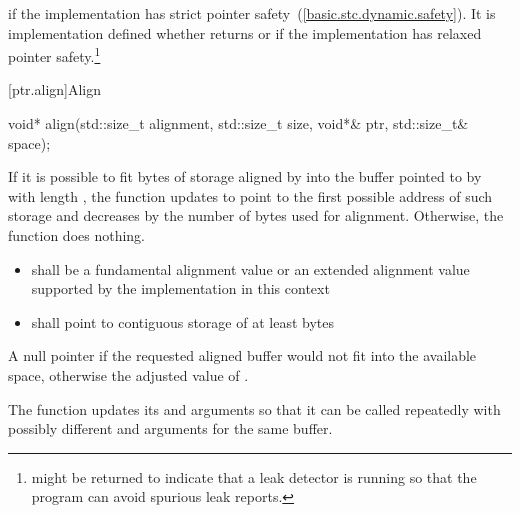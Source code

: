 \begin{itemdescr}
\pnum
\returns {} if the implementation has strict pointer
safety~(\ref{basic.stc.dynamic.safety}). It is implementation defined%
whether
 returns  or
 if the implementation has relaxed pointer
safety.\footnote{ might be returned to indicate
that a leak detector is running so that the program can avoid spurious leak
reports.}
\end{itemdescr}


[ptr.align]{Align}

%
\begin{itemdecl}
void* align(std::size_t alignment, std::size_t size,
    void*& ptr, std::size_t& space);
\end{itemdecl}

\begin{itemdescr}
\pnum
\effects If it is possible to fit  bytes
of storage aligned by  into the buffer pointed to by
 with length , the function updates
 to point to the first possible address of such storage
and decreases  by the number of bytes used for alignment.
Otherwise, the function does nothing.

\pnum
\requires

\begin{itemize}
\item {} shall be a fundamental alignment value or an
extended alignment value supported by the implementation in this context

\item {} shall point to contiguous storage of at least
 bytes
\end{itemize}

\pnum
\returns A null pointer if the requested aligned buffer
would not fit into the available space, otherwise the adjusted value
of .

\pnum
\enternote The function updates its 
and  arguments so that it can be called repeatedly
with possibly different  and 
arguments for the same buffer.  \exitnote
\end{itemdescr}


